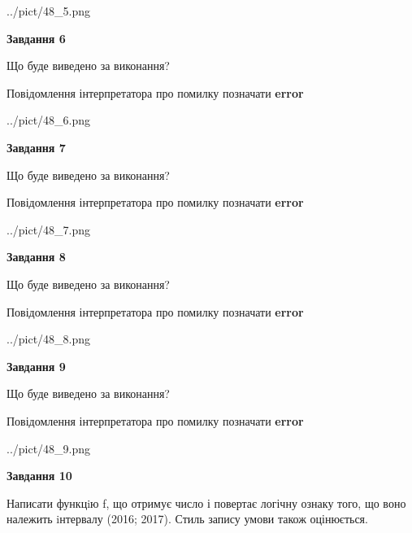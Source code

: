 \documentclass[12pt, ukrainian]{article}
\begin{document}
{\begin {large}
\begin{center}
	{../pict/48_5.png}
\end{center}
\newpage

{\begin {center}\textbf{Завдання 6}\end {center}}\par
Що буде виведено за виконання? \par
Повідомлення інтерпретатора про помилку позначати \textbf{error}

\begin{center}
	{../pict/48_6.png}
\end{center}
\newpage

{\begin {center}\textbf{Завдання 7}\end {center}}\par
Що буде виведено за виконання? \par
Повідомлення інтерпретатора про помилку позначати \textbf{error}

\begin{center}
	{../pict/48_7.png}
\end{center}
\newpage

{\begin {center}\textbf{Завдання 8}\end {center}}\par
Що буде виведено за виконання? \par
Повідомлення інтерпретатора про помилку позначати \textbf{error}

\begin{center}
	{../pict/48_8.png}
\end{center}
\newpage

{\begin {center}\textbf{Завдання 9}\end {center}}\par
Що буде виведено за виконання? \par
Повідомлення інтерпретатора про помилку позначати \textbf{error}

\begin{center}
	{../pict/48_9.png}
\end{center}
\newpage

{\begin {center}\textbf{Завдання 10}\end {center}}\par

Написати функцiю f, що отримує число і повертає логічну ознаку того, що воно належить iнтервалу (2016; 2017). Стиль запису умови також оцінюється.\par
\newpage

\end {large}}
\end{document}
